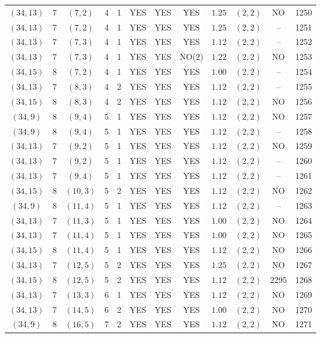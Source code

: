 \begin{longtable}{|c|c|c|c|c|c|c|c|c|c|c|c|}
$(34,13)$ & 7 & $(7,2)$ & 4 & 1 & YES & YES & YES & $1.25$ & $(2,2)$ & NO & 1250\\
$(34,13)$ & 7 & $(7,2)$ & 4 & 1 & YES & YES & YES & $1.25$ & $(2,2)$ & -- & 1251\\
$(34,13)$ & 7 & $(7,3)$ & 4 & 1 & YES & YES & YES & $1.12$ & $(2,2)$ & -- & 1252\\
$(34,13)$ & 7 & $(7,3)$ & 4 & 1 & YES & YES & NO(2) & $1.22$ & $(2,2)$ & NO & 1253\\
$(34,15)$ & 8 & $(7,2)$ & 4 & 1 & YES & YES & YES & $1.00$ & $(2,2)$ & -- & 1254\\
$(34,13)$ & 7 & $(8,3)$ & 4 & 2 & YES & YES & YES & $1.12$ & $(2,2)$ & -- & 1255\\
$(34,15)$ & 8 & $(8,3)$ & 4 & 2 & YES & YES & YES & $1.12$ & $(2,2)$ & NO & 1256\\
$(34,9)$ & 8 & $(9,4)$ & 5 & 1 & YES & YES & YES & $1.12$ & $(2,2)$ & NO & 1257\\
$(34,9)$ & 8 & $(9,4)$ & 5 & 1 & YES & YES & YES & $1.12$ & $(2,2)$ & -- & 1258\\
$(34,13)$ & 7 & $(9,2)$ & 5 & 1 & YES & YES & YES & $1.12$ & $(2,2)$ & NO & 1259\\
$(34,13)$ & 7 & $(9,2)$ & 5 & 1 & YES & YES & YES & $1.12$ & $(2,2)$ & -- & 1260\\
$(34,13)$ & 7 & $(9,4)$ & 5 & 1 & YES & YES & YES & $1.12$ & $(2,2)$ & -- & 1261\\
$(34,15)$ & 8 & $(10,3)$ & 5 & 2 & YES & YES & YES & $1.12$ & $(2,2)$ & NO & 1262\\
$(34,9)$ & 8 & $(11,4)$ & 5 & 1 & YES & YES & YES & $1.12$ & $(2,2)$ & -- & 1263\\
$(34,13)$ & 7 & $(11,3)$ & 5 & 1 & YES & YES & YES & $1.00$ & $(2,2)$ & NO & 1264\\
$(34,13)$ & 7 & $(11,4)$ & 5 & 1 & YES & YES & YES & $1.00$ & $(2,2)$ & NO & 1265\\
$(34,15)$ & 8 & $(11,4)$ & 5 & 1 & YES & YES & YES & $1.12$ & $(2,2)$ & NO & 1266\\
$(34,13)$ & 7 & $(12,5)$ & 5 & 2 & YES & YES & YES & $1.25$ & $(2,2)$ & NO & 1267\\
$(34,15)$ & 8 & $(12,5)$ & 5 & 2 & YES & YES & YES & $1.12$ & $(2,2)$ & 2295 & 1268\\
$(34,13)$ & 7 & $(13,3)$ & 6 & 1 & YES & YES & YES & $1.12$ & $(2,2)$ & NO & 1269\\
$(34,13)$ & 7 & $(14,5)$ & 6 & 2 & YES & YES & YES & $1.00$ & $(2,2)$ & NO & 1270\\
$(34,9)$ & 8 & $(16,5)$ & 7 & 2 & YES & YES & YES & $1.12$ & $(2,2)$ & NO & 1271\\

\end{longtable}
